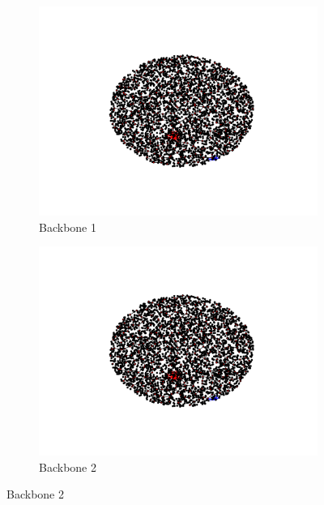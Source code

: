 \documentclass[oneside, titlepage]{scrartcl}
\begin{document}
\begin{figure}[!h]
\begin{subfigure}{0.5\textwidth}
	\centering
	\includegraphics[width=0.9\linewidth]{figures/simplegraph6.pdf}
	\caption{Backbone 1}
\end{subfigure}%
\begin{subfigure}{0.5\textwidth}
	\centering
	\includegraphics[width=0.9\linewidth]{figures/simplegraph61.pdf}
	\caption{Backbone 2}
\end{subfigure}
\end{figure}
\end{document}
